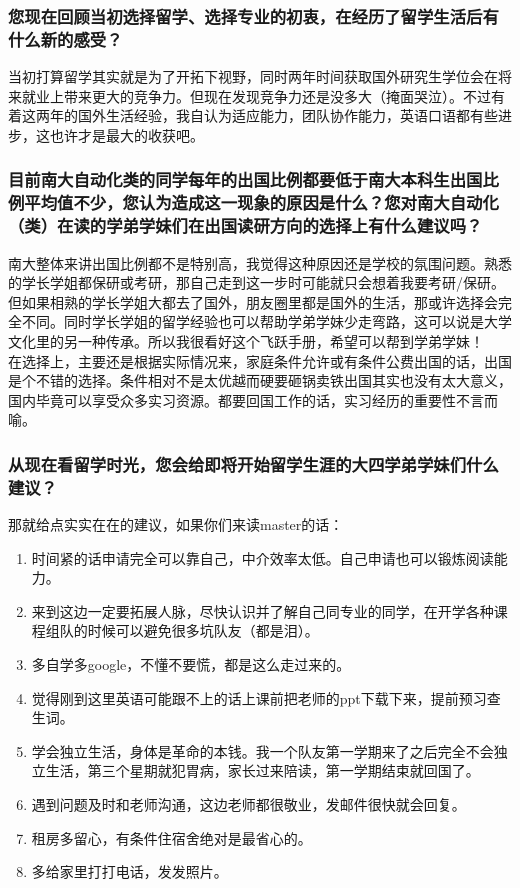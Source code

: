 \documentclass[a4paper,UTF8]{book}
\begin{document}
    \subsubsection*{您现在回顾当初选择留学、选择专业的初衷，在经历了留学生活后有什么新的感受？}
    当初打算留学其实就是为了开拓下视野，同时两年时间获取国外研究生学位会在将来就业上带来更大的竞争力。但现在发现竞争力还是没多大（掩面哭泣）。不过有着这两年的国外生活经验，我自认为适应能力，团队协作能力，英语口语都有些进步，这也许才是最大的收获吧。

    \subsubsection*{目前南大自动化类的同学每年的出国比例都要低于南大本科生出国比例平均值不少，您认为造成这一现象的原因是什么？您对南大自动化（类）在读的学弟学妹们在出国读研方向的选择上有什么建议吗？}
    南大整体来讲出国比例都不是特别高，我觉得这种原因还是学校的氛围问题。熟悉的学长学姐都保研或考研，那自己走到这一步时可能就只会想着我要考研/保研。但如果相熟的学长学姐大都去了国外，朋友圈里都是国外的生活，那或许选择会完全不同。同时学长学姐的留学经验也可以帮助学弟学妹少走弯路，这可以说是大学文化里的另一种传承。所以我很看好这个飞跃手册，希望可以帮到学弟学妹！\\
    在选择上，主要还是根据实际情况来，家庭条件允许或有条件公费出国的话，出国是个不错的选择。条件相对不是太优越而硬要砸锅卖铁出国其实也没有太大意义，国内毕竟可以享受众多实习资源。都要回国工作的话，实习经历的重要性不言而喻。

    \subsubsection*{从现在看留学时光，您会给即将开始留学生涯的大四学弟学妹们什么建议？}
    那就给点实实在在的建议，如果你们来读master的话：
    \begin{enumerate}
        \item 时间紧的话申请完全可以靠自己，中介效率太低。自己申请也可以锻炼阅读能力。
        \item 来到这边一定要拓展人脉，尽快认识并了解自己同专业的同学，在开学各种课程组队的时候可以避免很多坑队友（都是泪）。
        \item 多自学多google，不懂不要慌，都是这么走过来的。
        \item 觉得刚到这里英语可能跟不上的话上课前把老师的ppt下载下来，提前预习查生词。
        \item 学会独立生活，身体是革命的本钱。我一个队友第一学期来了之后完全不会独立生活，第三个星期就犯胃病，家长过来陪读，第一学期结束就回国了。
        \item 遇到问题及时和老师沟通，这边老师都很敬业，发邮件很快就会回复。
        \item 租房多留心，有条件住宿舍绝对是最省心的。
        \item 多给家里打打电话，发发照片。
    \end{enumerate}
\end{document}
